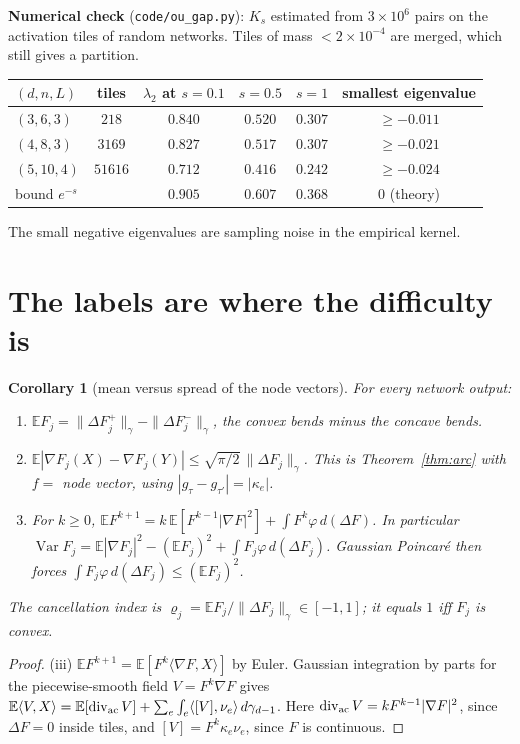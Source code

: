 \documentclass[11pt]{article}
\newtheorem{corollary}[theorem]{Corollary}
\theoremstyle{definition}
\theoremstyle{remark}
\newcommand{\E}{\mathbb E}
\newcommand{\Var}{\operatorname{Var}}
\begin{document}
\textbf{Numerical check} (\texttt{code/ou\_gap.py}): $K_s$ estimated from $3\times10^6$ pairs on the activation tiles of random networks. Tiles of mass $<2\times10^{-4}$ are merged, which still gives a partition.
\begin{center}\small
\begin{tabular}{lccccc}
\toprule
$(d,n,L)$ & tiles & $\lambda_2$ at $s=0.1$ & $s=0.5$ & $s=1$ & smallest eigenvalue\\
\midrule
$(3,6,3)$ & $218$ & $0.840$ & $0.520$ & $0.307$ & $\ge-0.011$\\
$(4,8,3)$ & $3169$ & $0.827$ & $0.517$ & $0.307$ & $\ge-0.021$\\
$(5,10,4)$ & $51616$ & $0.712$ & $0.416$ & $0.242$ & $\ge-0.024$\\
bound $e^{-s}$ & & $0.905$ & $0.607$ & $0.368$ & $0$ (theory)\\
\bottomrule
\end{tabular}
\end{center}
The small negative eigenvalues are sampling noise in the empirical kernel.

\section{The labels are where the difficulty is}

\begin{corollary}[mean versus spread of the node vectors]\label{cor:spread}
For every network output:
\begin{enumerate}
\item[(i)] $\E F_j=\|\Delta F_j^+\|_\gamma-\|\Delta F_j^-\|_\gamma$, the convex bends minus the concave bends.
\item[(ii)] $\E|\nabla F_j(X)-\nabla F_j(Y)|\le\sqrt{\pi/2}\,\|\Delta F_j\|_\gamma$. This is Theorem~\ref{thm:arc} with $f=$ node vector, using $|g_\tau-g_{\tau'}|=|\kappa_e|$.
\item[(iii)] For $k\ge0$, $\E F^{k+1}=k\,\E[F^{k-1}|\nabla F|^2]+\int F^k\varphi\,d(\Delta F)$. In particular $\Var F_j=\E|\nabla F_j|^2-(\E F_j)^2+\int F_j\varphi\,d(\Delta F_j)$. Gaussian Poincar\'e then forces $\int F_j\varphi\,d(\Delta F_j)\le(\E F_j)^2$.
\end{enumerate}
The \emph{cancellation index} is $\varrho_j=\E F_j/\|\Delta F_j\|_\gamma\in[-1,1]$; it equals $1$ iff $F_j$ is convex.
\end{corollary}

\begin{proof}
(iii) $\E F^{k+1}=\E[F^k\langle\nabla F,X\rangle]$ by Euler. Gaussian integration by parts for the piecewise-smooth field $V=F^k\nabla F$ gives $\E\langle V,X\rangle=\E[\operatorname{div}_{\rm ac}V]+\sum_e\int_e\langle[V],\nu_e\rangle\,d\gamma_{d-1}$. Here $\operatorname{div}_{\rm ac}V=kF^{k-1}|\nabla F|^2$, since $\Delta F=0$ inside tiles, and $[V]=F^k\kappa_e\nu_e$, since $F$ is continuous.
\end{proof}
\end{document}
